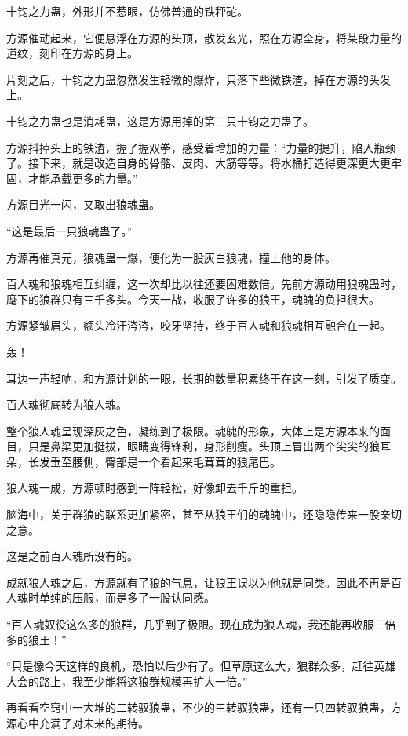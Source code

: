 \begin{this_body}
十钧之力蛊，外形并不惹眼，仿佛普通的铁秤砣。

方源催动起来，它便悬浮在方源的头顶，散发玄光，照在方源全身，将某段力量的道纹，刻印在方源的身上。

片刻之后，十钧之力蛊忽然发生轻微的爆炸，只落下些微铁渣，掉在方源的头发上。

十钧之力蛊也是消耗蛊，这是方源用掉的第三只十钧之力蛊了。

方源抖掉头上的铁渣，握了握双拳，感受着增加的力量：“力量的提升，陷入瓶颈了。接下来，就是改造自身的骨骼、皮肉、大筋等等。将水桶打造得更深更大更牢固，才能承载更多的力量。”

方源目光一闪，又取出狼魂蛊。

“这是最后一只狼魂蛊了。”

方源再催真元，狼魂蛊一爆，便化为一股灰白狼魂，撞上他的身体。

百人魂和狼魂相互纠缠，这一次却比以往还要困难数倍。先前方源动用狼魂蛊时，麾下的狼群只有三千多头。今天一战，收服了许多的狼王，魂魄的负担很大。

方源紧皱眉头，额头冷汗涔涔，咬牙坚持，终于百人魂和狼魂相互融合在一起。

轰！

耳边一声轻响，和方源计划的一眼，长期的数量积累终于在这一刻，引发了质变。

百人魂彻底转为狼人魂。

整个狼人魂呈现深灰之色，凝练到了极限。魂魄的形象，大体上是方源本来的面目，只是鼻梁更加挺拔，眼睛变得锋利，身形削瘦。头顶上冒出两个尖尖的狼耳朵，长发垂至腰侧，臀部是一个看起来毛茸茸的狼尾巴。

狼人魂一成，方源顿时感到一阵轻松，好像卸去千斤的重担。

脑海中，关于群狼的联系更加紧密，甚至从狼王们的魂魄中，还隐隐传来一股亲切之意。

这是之前百人魂所没有的。

成就狼人魂之后，方源就有了狼的气息，让狼王误以为他就是同类。因此不再是百人魂时单纯的压服，而是多了一股认同感。

“百人魂奴役这么多的狼群，几乎到了极限。现在成为狼人魂，我还能再收服三倍多的狼王！”

“只是像今天这样的良机，恐怕以后少有了。但草原这么大，狼群众多，赶往英雄大会的路上，我至少能将这狼群规模再扩大一倍。”

再看看空窍中一大堆的二转驭狼蛊，不少的三转驭狼蛊，还有一只四转驭狼蛊，方源心中充满了对未来的期待。

\end{this_body}

